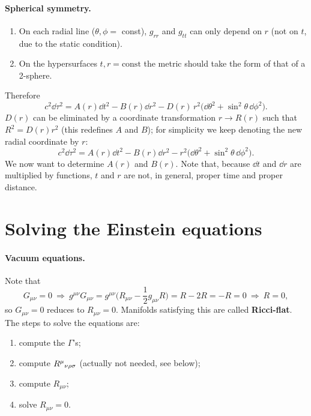 \paragraph{Spherical symmetry.}
\begin{enumerate}[label=(\roman*),nosep]
\item On each radial line ($\theta,\phi=$ const), $g_{rr}$ and $g_{tt}$ can only depend on $r$ (not on $t$, due to the static condition).
\item On the hypersurfaces $t,r=\text{const}$ the metric should take the form of that of a 2-sphere.
\end{enumerate}
Therefore
\[
  c^2\dd\tau^2=A(r)\dd t^2-B(r)\dd r^2-D(r)\,r^2\big(\dd\theta^2+\sin^2\theta\,\dd\phi^2\big).
\]
$D(r)$ can be eliminated by a coordinate transformation $r\to R(r)$ such that $R^2=D(r)r^2$ (this redefines $A$ and $B$); for simplicity we keep denoting the new radial coordinate by $r$:
\begin{equation}
  c^2\dd\tau^2=A(r)\dd t^2-B(r)\dd r^2-r^2\big(\dd\theta^2+\sin^2\theta\,\dd\phi^2\big).
  \label{eq:schw-ansatz}
\end{equation}
We now want to determine $A(r)$ and $B(r)$. Note that, because $\dd t$ and $\dd r$ are multiplied by functions, $t$ and $r$ are not, in general, proper time and proper distance.

\section{Solving the Einstein equations}

\paragraph{Vacuum equations.} Note that
\[
  G_{\mu\nu}=0\ \Rightarrow\ g^{\mu\nu}G_{\mu\nu}=g^{\mu\nu}\Big(R_{\mu\nu}-\frac12g_{\mu\nu}R\Big)=R-2R=-R=0\ \Rightarrow\ R=0 ,
\]
so $G_{\mu\nu}=0$ reduces to $\boxed{R_{\mu\nu}=0}$. Manifolds satisfying this are called \textbf{Ricci-flat}. The steps to solve the equations are:
\begin{enumerate}[nosep]
\item compute the $\Gamma$'s;
\item compute $R^{\mu}{}_{\nu\rho\sigma}$ (actually not needed, see below);
\item compute $R_{\mu\nu}$;
\item solve $R_{\mu\nu}=0$.
\end{enumerate}

